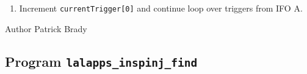 \begin{entry}
\begin{enumerate}
\begin{enumerate}
\item Increment \texttt{currentTrigger[0]} and continue loop over triggers
from IFO A.
\end{enumerate}
\end{enumerate}

\item[Author] 
Patrick Brady
\end{entry}
\clearpage


%
% 
\clearpage
\subsection{Program \texttt{lalapps\_inspinj\_find}}
\label{program:lalapps-inspinj-find}

